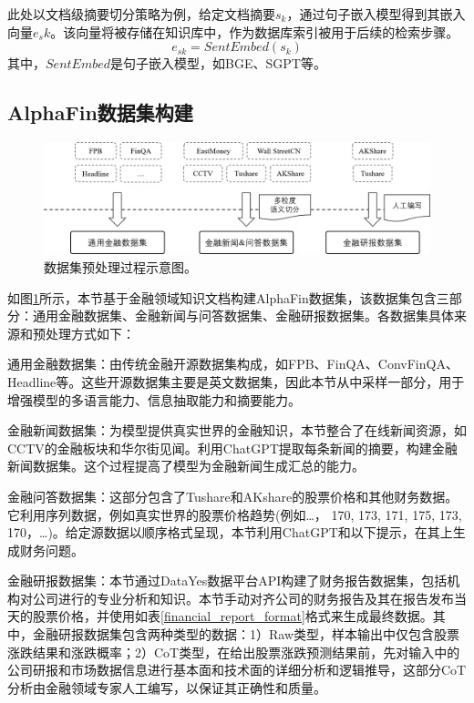 此处以文档级摘要切分策略为例，给定文档摘要$s_k$，通过句子嵌入模型得到其嵌入向量$e_sk$。该向量将被存储在知识库中，作为数据库索引被用于后续的检索步骤。
\begin{equation}
	e_{sk} = SentEmbed(s_k)
\end{equation}
其中，$SentEmbed$是句子嵌入模型，如BGE、SGPT等。

\subsection{AlphaFin数据集构建}

\begin{figure}[htbp]
	\centering
	\includegraphics[scale=0.6]{Fig/dataset_process.png}
	\caption{\label{dataset_process}数据集预处理过程示意图。}
\end{figure}

如图\ref{dataset_process}所示，本节基于金融领域知识文档构建AlphaFin数据集，该数据集包含三部分：通用金融数据集、金融新闻与问答数据集、金融研报数据集。各数据集具体来源和预处理方式如下：

通用金融数据集：由传统金融开源数据集构成，如FPB\cite{DBLP:journals/jasis/MaloSKWT14}、FinQA\cite{DBLP:conf/acl/ZhuLHWZLFC20}、ConvFinQA\cite{DBLP:journals/corr/abs-2310-00566}、Headline\cite{DBLP:journals/corr/abs-2009-04202}等。这些开源数据集主要是英文数据集，因此本节从中采样一部分，用于增强模型的多语言能力、信息抽取能力和摘要能力。

金融新闻数据集：为模型提供真实世界的金融知识，本节整合了在线新闻资源，如CCTV的金融板块和华尔街见闻。利用ChatGPT\cite{DBLP:conf/nips/Ouyang0JAWMZASR22}提取每条新闻的摘要，构建金融新闻数据集。这个过程提高了模型为金融新闻生成汇总的能力。

金融问答数据集：这部分包含了Tushare\cite{tushare}和AKshare\cite{akshare}的股票价格和其他财务数据。它利用序列数据，例如真实世界的股票价格趋势(例如{…， 170, 173, 171, 175, 173, 170，…})。给定源数据以顺序格式呈现，本节利用ChatGPT和以下提示，在其上生成财务问题。

金融研报数据集：本节通过DataYes数据平台API构建了财务报告数据集，包括机构对公司进行的专业分析和知识。本节手动对齐公司的财务报告及其在报告发布当天的股票价格，并使用如表\ref{financial_report_format}格式来生成最终数据。其中，金融研报数据集包含两种类型的数据：1）Raw类型，样本输出中仅包含股票涨跌结果和涨跌概率；2）CoT类型，在给出股票涨跌预测结果前，先对输入中的公司研报和市场数据信息进行基本面和技术面的详细分析和逻辑推导，这部分CoT分析由金融领域专家人工编写，以保证其正确性和质量。

